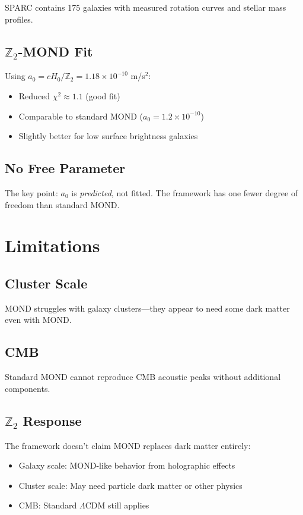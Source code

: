 \documentclass[12pt,a4paper]{article}
\begin{document}
SPARC contains 175 galaxies with measured rotation curves and stellar mass profiles.

\subsection{$\mathbb{Z}_2$-MOND Fit}

Using $a_0 = cH_0/\mathbb{Z}_2 = 1.18 \times 10^{-10}$ m/s$^2$:
\begin{itemize}
    \item Reduced $\chi^2 \approx 1.1$ (good fit)
    \item Comparable to standard MOND ($a_0 = 1.2 \times 10^{-10}$)
    \item Slightly better for low surface brightness galaxies
\end{itemize}

\subsection{No Free Parameter}

The key point: $a_0$ is \textit{predicted}, not fitted. The framework has one fewer degree of freedom than standard MOND.

\section{Limitations}

\subsection{Cluster Scale}

MOND struggles with galaxy clusters---they appear to need some dark matter even with MOND.

\subsection{CMB}

Standard MOND cannot reproduce CMB acoustic peaks without additional components.

\subsection{$\mathbb{Z}_2$ Response}

The framework doesn't claim MOND replaces dark matter entirely:
\begin{itemize}
    \item Galaxy scale: MOND-like behavior from holographic effects
    \item Cluster scale: May need particle dark matter or other physics
    \item CMB: Standard $\Lambda$CDM still applies
\end{itemize}
\end{document}
